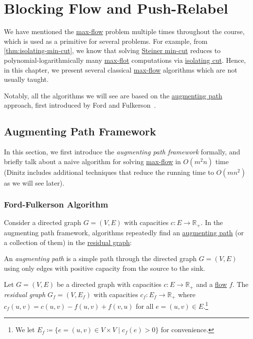 \chapter{Blocking Flow and Push-Relabel}
We have mentioned the \hyperref[prb:s-t-max-flow]{max-flow} problem multiple times throughout the course, which is used as a primitive for several problems. For example, from \autoref{thm:isolating-min-cut}, we know that solving \hyperref[prb:Steiner-min-cut]{Steiner min-cut} reduces to polynomial-logarithmically many \hyperref[prb:s-t-max-flow]{max-flot} computations via \hyperref[prb:isolating-cut]{isolating cut}. Hence, in this chapter, we present several classical \hyperref[prb:s-t-max-flow]{max-flow} algorithms which are not usually taught.

Notably, all the algorithms we will see are based on the \hyperref[def:augmenting-path]{augmenting path} approach, first introduced by Ford and Fulkerson~\cite{ford1956maximal}.

\section{Augmenting Path Framework}
In this section, we first introduce the \emph{augmenting path framework} formally, and briefly talk about a naive algorithm for solving \hyperref[prb:s-t-max-flow]{max-flow} in \(O(m^2 n)\) time~\cite{dinic1970algorithm,edmonds1972theoretical} (Dinitz includes additional techniques that reduce the running time to \(O(m n^2)\) as we will see later).

\subsection{Ford-Fulkerson Algorithm}
Consider a directed graph \(G = (V, E)\) with capacities \(c \colon E \to \mathbb{R} _{+}\). In the augmenting path framework, algorithms repeatedly find an \hyperref[def:augmenting-path]{augmenting path} (or a collection of them) in the \hyperref[def:residual-graph]{residual graph}:

\begin{definition}\label{def:augmenting-path}
	An \emph{augmenting path} is a simple path through the directed graph \(G = (V, E)\) using only edges with positive capacity from the source to the sink.
\end{definition}

\begin{definition}\label{def:residual-graph}
	Let \(G = (V, E)\) be a directed graph with capacities \(c \colon E \to \mathbb{R} _{+}\) and a \hyperref[def:flow]{flow} \(f\). The \emph{residual graph} \(G_f = (V, E_f )\) with capacities \(c_f \colon E_f \to \mathbb{R} _{+}\) where \(c_f (u, v) = c(u, v) - f(u, v) + f(v, u)\) for all \(e = (u, v) \in E\).\footnote{We let \(E_f \coloneqq \{ e = (u, v) \in V \times V \mid c_f(e) > 0 \} \) for convenience.}
\end{definition}

